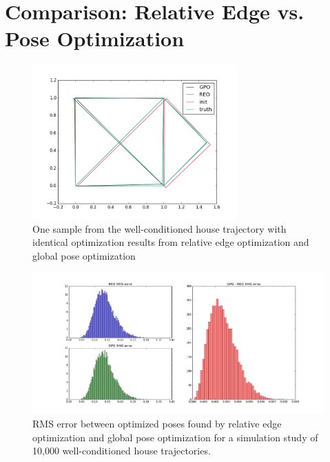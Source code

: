 
\section{Comparison: Relative Edge vs. Pose Optimization}

\begin{figure}
  \includegraphics[width=0.7\textwidth]{figures/house_trajectory.png}
  \caption{One sample from the well-conditioned house trajectory with identical optimization results from relative edge optimization and global pose optimization}
  \label{fig:house_trajectory}
\end{figure}

\begin{figure}
  \includegraphics[width=\textwidth]{figures/REO_vs_GPO_good.png}
  \caption{RMS error between optimized poses found by relative edge optimization and global pose optimization for a simulation study of 10,000 well-conditioned house trajectories.}
  \label{fig:convergence_house}
\end{figure}

